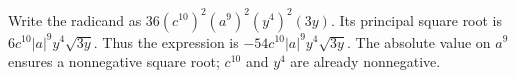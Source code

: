 Write the radicand as $36(c^{10})^2(a^9)^2(y^4)^2(3y)$. Its principal square root is $6c^{10}|a|^9y^4\sqrt{3y}$. Thus the expression is $\boxed{-54c^{10}|a|^9y^4\sqrt{3y}}$. The absolute value on $a^9$ ensures a nonnegative square root; $c^{10}$ and $y^4$ are already nonnegative.
